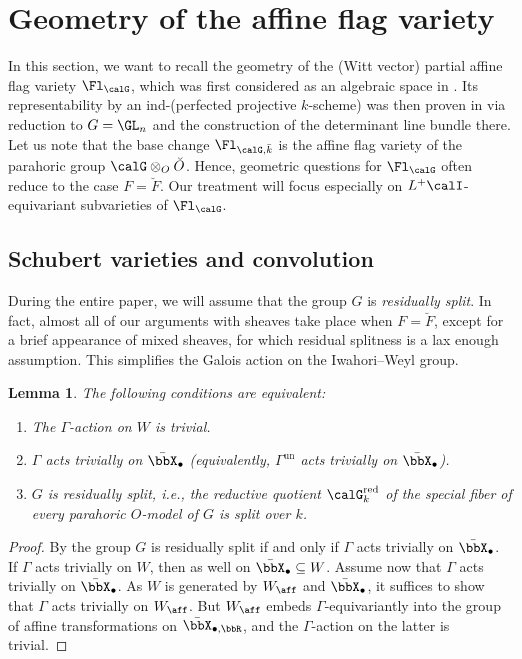 \documentclass[10pt, reqno]{amsart}
\theoremstyle{plain}
\newtheorem{lemma}[theorem]{Lemma}
\theoremstyle{definition}
\numberwithin{equation}{section}
\begin{document}
	\section{Geometry of the affine flag variety}
	\label{sec:geometry-affine-flag}
	
	In this section, we want to recall the geometry of the (Witt vector) partial affine flag variety $\Fl_\calG$, which was first considered as an algebraic space in \cite[Section 1.4]{Zhu17}. Its representability by an ind-(perfected projective $k$-scheme) was then proven in \cite[Corollary 9.6]{BS17} via reduction to $G=\GL_n$ and the construction of the determinant line bundle there.
	Let us note that the base change $\Fl_{\calG,\bar k}$ is the affine flag variety of the parahoric group $\calG \otimes_O \breve{O}$.
	Hence, geometric questions for $\Fl_\calG$ often reduce to the case $F=\breve{F}$. Our treatment will focus especially on $L^+\calI$-equivariant subvarieties of $\Fl_\calG$.
	
	\subsection{Schubert varieties and convolution}
	\label{sec:schub-vari-conv}
	
	During the entire paper, we will assume that the group $G$ is {\it residually split}. In fact, almost all of our arguments with sheaves take place when $F=\breve{F}$, except for a brief appearance of mixed sheaves, for which residual splitness is a lax enough assumption. This simplifies the Galois action on the Iwahori--Weyl group.
	
	\begin{lemma}
		\label{sec:geometry-affine-flag-1-residually-split}
		The following conditions are equivalent:
		\begin{enumerate}
			\item The $\Gamma$-action on $W$ is trivial.
			\item $\Gamma$ acts trivially on $\bar{\bbX}_\bullet$ (equivalently, $\Gamma^{\mathrm{un}}$ acts trivially on $\bar{\bbX}_\bullet$).
			\item $G$ is residually split, i.e., the reductive quotient $\calG_k^{\mathrm{red}}$ of the special fiber of every parahoric $O$-model of $G$ is split over $k$.
		\end{enumerate}
	\end{lemma}
	\begin{proof}
		By \cite[Proposition 9.10.10]{KP23} the group $G$ is residually split if and only if $\Gamma$ acts trivially on $\bar{\bbX}_\bullet$. If $\Gamma$ acts  trivially on $W$, then as well on $\bar{\bbX}_\bullet\subseteq W$. Assume now that $\Gamma$ acts trivially on $\bar{\bbX}_\bullet$. As $W$ is generated by $W_\aff$ and $\bar{\bbX}_\bullet$, it suffices to show that $\Gamma$ acts trivially on $W_\aff$. But $W_\aff$ embeds $\Gamma$-equivariantly into the group of affine transformations on $\bar{\bbX}_{\bullet,\bbR}$, and the $\Gamma$-action on the latter is trivial. 
	\end{proof}
	
\end{document}
